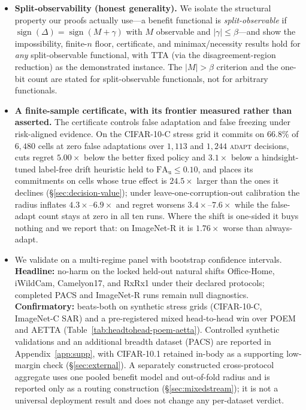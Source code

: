\documentclass[conference]{IEEEtran}
\theoremstyle{plain}
\theoremstyle{definition}
\newcommand{\sign}{\operatorname{sign}}
\begin{document}
\begin{itemize}
first feasible on real data at exactly $K=9$). The escape is one logical move---average over the
episode law instead of taking a supremum over the fibre, paid for with historical labels---and
neither ingredient suffices alone (Proposition~\ref{epi:prop-escape}). The assumption that buys it
is measured and it fails on the axis that defines a new deployment: against a nominal
$0.900$, coverage is $0.905$ on an exchangeable control, $0.626$ when the corruption family
changes and $0.454$ when severity changes;
weighted conformal restores coverage to $1.000$ by driving decision yield to $0.000$.
\item \textbf{Split-observability (honest generality).} We isolate the structural property our
proofs actually use---a benefit functional is \emph{split-observable} if
$\sign(\Delta)=\sign(M+\gamma)$ with $M$ observable and $|\gamma|\le\beta$---and show the
impossibility, finite-$n$ floor, certificate, and minimax/necessity results hold for \emph{any}
split-observable functional, with TTA (via the disagreement-region reduction) as the demonstrated
instance. The $|M|>\beta$ criterion and the one-bit count are stated for split-observable
functionals, not for arbitrary functionals.
\item \textbf{A finite-sample certificate, with its frontier measured rather than asserted.} The
certificate controls false adaptation and false freezing under risk-aligned evidence. On the
CIFAR-10-C stress grid it commits on $66.8\%$ of $6{,}480$ cells at zero false adaptations over
$1{,}113$ and $1{,}244$ \textsc{adapt} decisions, cuts regret $5.00\times$ below the better fixed
policy and $3.1\times$ below a hindsight-tuned label-free drift heuristic held to
$\mathrm{FA}_{\mathrm u}\le0.10$, and places its commitments on cells whose true effect is
$24.5\times$ larger than the ones it declines (\S\ref{sec:decision-value}); under
leave-one-corruption-out calibration the radius inflates $4.3\times$--$6.9\times$ and regret worsens
$3.4\times$--$7.6\times$ while the false-adapt count stays at zero in all ten runs. Where the shift
is one-sided it buys nothing and we report that: on ImageNet-R it is $1.76\times$ worse than
always-adapt.
\item We validate on a multi-regime panel with bootstrap confidence intervals.
\textbf{Headline:} no-harm on the locked held-out natural shifts Office-Home, iWildCam,
Camelyon17, and RxRx1 under their declared protocols; completed PACS and ImageNet-R runs remain
null diagnostics. \textbf{Confirmatory:} beats-both on
synthetic stress grids (CIFAR-10-C, ImageNet-C SAR) and a pre-registered mixed head-to-head win over
POEM and AETTA (Table~\ref{tab:headtohead-poem-aetta}). Controlled synthetic validations and an
additional breadth dataset (PACS) are reported in Appendix~\ref{app:supp}, with CIFAR-10.1 retained
in-body as a supporting low-margin check (\S\ref{sec:external}). A separately constructed
cross-protocol aggregate uses one pooled benefit model and out-of-fold radius and is reported only
as a routing construction (\S\ref{sec:mixedstream}); it is not a universal deployment result and
does not change any per-dataset verdict.
\end{itemize}
\end{document}
